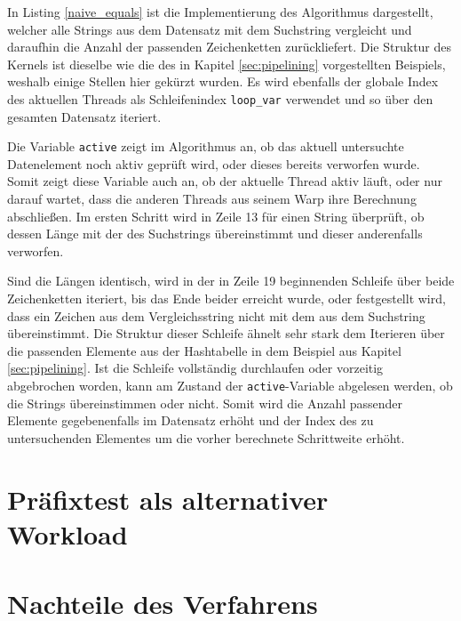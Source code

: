 In Listing \ref{naive_equals} ist die Implementierung des Algorithmus dargestellt, welcher alle Strings aus dem Datensatz mit dem Suchstring vergleicht und daraufhin die Anzahl der passenden Zeichenketten zurückliefert.
Die Struktur des Kernels ist dieselbe wie die des in Kapitel \ref{sec:pipelining} vorgestellten Beispiels, weshalb einige Stellen hier gekürzt wurden.
Es wird ebenfalls der globale Index des aktuellen Threads als Schleifenindex \texttt{loop\_var} verwendet und so über den gesamten Datensatz iteriert.

Die Variable \texttt{active} zeigt im Algorithmus an, ob das aktuell untersuchte Datenelement noch aktiv geprüft wird, oder dieses bereits verworfen wurde.
Somit zeigt diese Variable auch an, ob der aktuelle Thread aktiv läuft, oder nur darauf wartet, dass die anderen Threads aus seinem Warp ihre Berechnung abschließen.
Im ersten Schritt wird in Zeile 13 für einen String überprüft, ob dessen Länge mit der des Suchstrings übereinstimmt und dieser anderenfalls verworfen.

Sind die Längen identisch, wird in der in Zeile 19 beginnenden Schleife über beide Zeichenketten iteriert, bis das Ende beider erreicht wurde, oder festgestellt wird, dass ein Zeichen aus dem Vergleichsstring nicht mit dem aus dem Suchstring übereinstimmt. %
Die Struktur dieser Schleife ähnelt sehr stark dem Iterieren über die passenden Elemente aus der Hashtabelle in dem Beispiel aus Kapitel \ref{sec:pipelining}.
Ist die Schleife vollständig durchlaufen oder vorzeitig abgebrochen worden, kann am Zustand der \texttt{active}-Variable abgelesen werden, ob die Strings übereinstimmen oder nicht.
Somit wird die Anzahl passender Elemente gegebenenfalls im Datensatz erhöht und der Index des zu untersuchenden Elementes um die vorher berechnete Schrittweite erhöht.

\section{Präfixtest als alternativer Workload}

\section{Nachteile des Verfahrens}